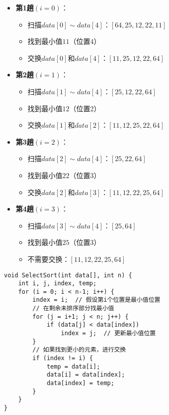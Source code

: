 \documentclass[12pt,a4paper]{amsart}
\begin{document}
\begin{itemize}
\item \textbf{第1趟$(i=0)$}：
    \begin{itemize}
    \item 扫描$data[0] \sim data[4]$：$[64, 25, 12, 22, 11]$
    \item 找到最小值$11$（位置4）
    \item 交换$data[0]$和$data[4]$：$[11, 25, 12, 22, 64]$
    \end{itemize}

\item \textbf{第2趟$(i=1)$}：
    \begin{itemize}
    \item 扫描$data[1] \sim data[4]$：$[25, 12, 22, 64]$
    \item 找到最小值$12$（位置2）
    \item 交换$data[1]$和$data[2]$：$[11, 12, 25, 22, 64]$
    \end{itemize}

\item \textbf{第3趟$(i=2)$}：
    \begin{itemize}
    \item 扫描$data[2] \sim data[4]$：$[25, 22, 64]$
    \item 找到最小值$22$（位置3）
    \item 交换$data[2]$和$data[3]$：$[11, 12, 22, 25, 64]$
    \end{itemize}

\item \textbf{第4趟$(i=3)$}：
    \begin{itemize}
    \item 扫描$data[3] \sim data[4]$：$[25, 64]$
    \item 找到最小值$25$（位置3）
    \item 不需要交换：$[11, 12, 22, 25, 64]$
    \end{itemize}
\end{itemize}

\begin{lstlisting}[caption=简单选择排序实现]
void SelectSort(int data[], int n) {
    int i, j, index, temp;
    for (i = 0; i < n-1; i++) {
        index = i;  // 假设第i个位置是最小值位置
        // 在剩余未排序部分找最小值
        for (j = i+1; j < n; j++) {
            if (data[j] < data[index]) 
                index = j;  // 更新最小值位置
        }
        // 如果找到更小的元素，进行交换
        if (index != i) {
            temp = data[i]; 
            data[i] = data[index]; 
            data[index] = temp;
        }
    }
}
\end{lstlisting}
\end{document}
